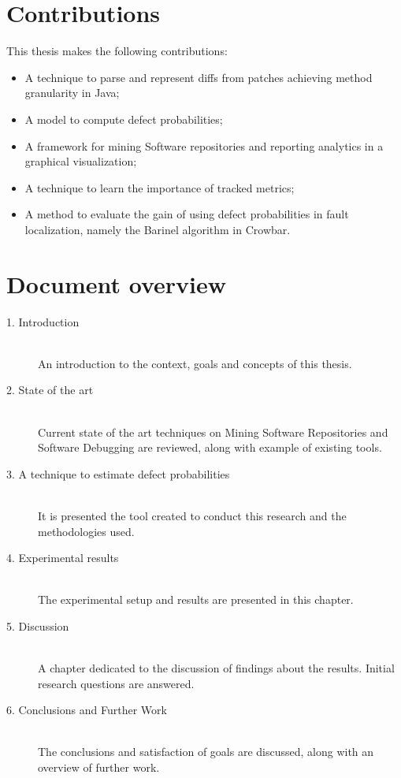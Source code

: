 \section{Contributions}
This thesis makes the following contributions:

\begin{itemize}
\item A technique to parse and represent diffs from patches achieving method
granularity in Java;
\item A model to compute defect probabilities;
\item A framework for mining Software repositories and reporting analytics
in a graphical visualization;
\item A technique to learn the importance of tracked metrics;
\item A method to evaluate the gain of using defect probabilities in fault
 localization, namely the Barinel algorithm in Crowbar.
\end{itemize}

\section{Document overview}
\begin{description}
  \item[1. Introduction] \hfill \\
  An introduction to the context, goals and concepts of this thesis.

  \item[2. State of the art] \hfill \\
  Current state of the art techniques on Mining Software Repositories and
  Software Debugging are reviewed, along with example of existing tools.

  \item[3. A technique to estimate defect probabilities] \hfill \\
  It is presented the tool created to conduct this research and the
  methodologies used.

  \item[4. Experimental results] \hfill \\
  The experimental setup and results are presented in this chapter.

  \item[5. Discussion] \hfill \\
  A chapter dedicated to the discussion of findings about the results.
  Initial research questions are answered.

  \item[6. Conclusions and Further Work] \hfill \\
  The conclusions and satisfaction of goals are discussed, along with an
  overview of further work.

\end{description}
